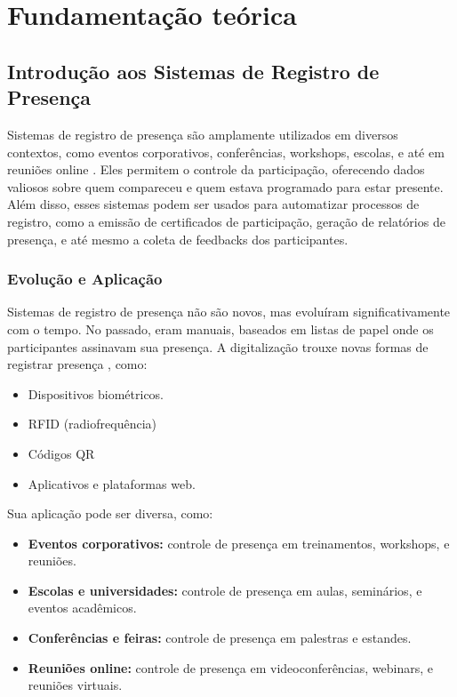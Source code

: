 \section{Fundamentação teórica}
\label{sec:fundamentacao_teorica}

\subsection{Introdução aos Sistemas de Registro de Presença}
Sistemas de registro de presença são amplamente utilizados em diversos contextos, como eventos corporativos, conferências, workshops, escolas, e até em reuniões online \cite{ferreira2023}. Eles permitem o controle da participação, oferecendo dados valiosos sobre quem compareceu e quem estava programado para estar presente. Além disso, esses sistemas podem ser usados para automatizar processos de registro, como a emissão de certificados de participação, geração de relatórios de presença, e até mesmo a coleta de feedbacks dos participantes.

\subsubsection{Evolução e Aplicação}
Sistemas de registro de presença não são novos, mas evoluíram significativamente com o tempo. No passado, eram manuais, baseados em listas de papel onde os participantes assinavam sua presença. A digitalização trouxe novas formas de registrar presença \cite{jibble2024}, como:
\begin{itemize}
    \item Dispositivos biométricos.
    \item RFID (radiofrequência)
    \item Códigos QR
    \item Aplicativos e plataformas web.
\end{itemize}

Sua aplicação pode ser diversa, como:
\begin{itemize}
    \item \textbf{Eventos corporativos:} controle de presença em treinamentos, workshops, e reuniões.
    \item \textbf{Escolas e universidades:} controle de presença em aulas, seminários, e eventos acadêmicos.
    \item \textbf{Conferências e feiras:} controle de presença em palestras e estandes.
    \item \textbf{Reuniões online:} controle de presença em videoconferências, webinars, e reuniões virtuais.
\end{itemize}

